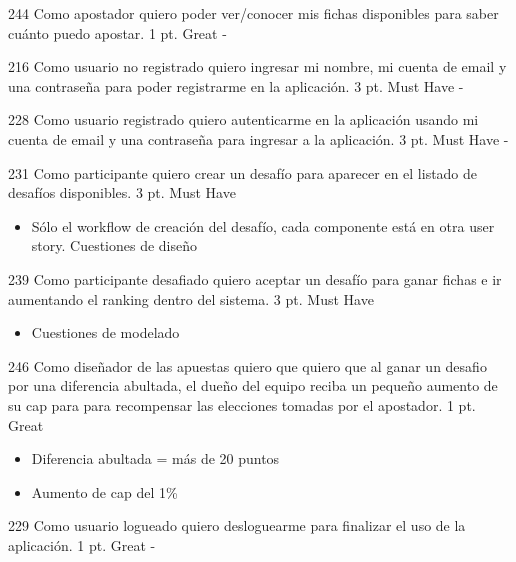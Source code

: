 \vspace{1cm}

\simplestory
{244}
{Como apostador quiero poder ver/conocer mis fichas disponibles para saber cuánto puedo apostar.}
{1 pt.}
{Great}
{-}

\vspace{1cm}

\simplestory
{216}
{Como usuario no registrado quiero ingresar mi nombre, mi cuenta de email y una contraseña para poder registrarme en la aplicación.}
{3 pt.}
{Must Have}
{-}

\vspace{1cm}

\simplestory
{228}
{Como usuario registrado quiero autenticarme en la aplicación usando mi cuenta de email y una contraseña para ingresar a la aplicación.}
{3 pt.}
{Must Have}
{-}

\vspace{1cm}

\simplestory
{231}
{Como participante quiero crear un desafío para aparecer en el listado de desafíos disponibles.}
{3 pt.}
{Must Have}
{\begin{itemize}
\item Sólo el workflow de creación del desafío, cada componente está en otra user story.
Cuestiones de diseño
\end{itemize}}

\vspace{1cm}

\simplestory
{239}
{Como participante desafiado quiero aceptar un desafío para ganar fichas e ir aumentando el ranking dentro del sistema.}
{3 pt.}
{Must Have}
{\begin{itemize}
\item Cuestiones de modelado
\end{itemize}}

\vspace{1cm}

\simplestory
{246}
{Como diseñador de las apuestas quiero que quiero que al ganar un desafio por una diferencia abultada, el dueño del equipo reciba un pequeño aumento de su cap para para recompensar las elecciones tomadas por el apostador.}
{1 pt.}
{Great}
{\begin{itemize}
\item Diferencia abultada = más de 20 puntos
\item Aumento de cap del 1\%
\end{itemize}}

\vspace{1cm}

\simplestory
{229}
{Como usuario logueado quiero desloguearme para finalizar el uso de la aplicación.}
{1 pt.}
{Great}
{-}
